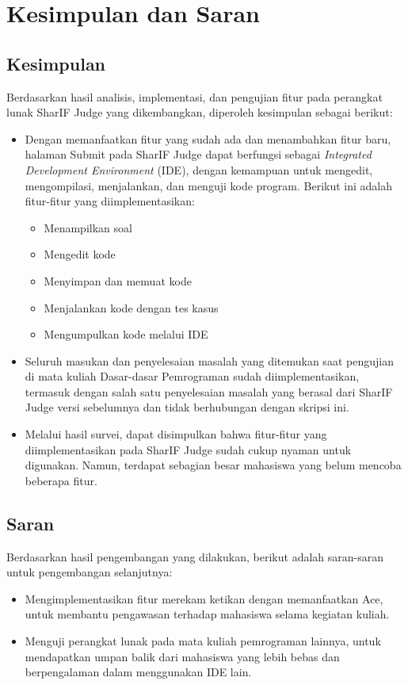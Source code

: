 \chapter{Kesimpulan dan Saran}
\label{chap:kesimpulandansaran}

\section{Kesimpulan}
\label{sec:6:kesimpulan}

Berdasarkan hasil analisis, implementasi, dan pengujian fitur pada perangkat lunak SharIF Judge yang dikembangkan, diperoleh kesimpulan sebagai berikut:

\begin{itemize}
    \item Dengan memanfaatkan fitur yang sudah ada dan menambahkan fitur baru, halaman Submit pada SharIF Judge dapat berfungsi sebagai {\it Integrated Development Environment} (IDE), dengan kemampuan untuk mengedit, mengompilasi, menjalankan, dan menguji kode program. Berikut ini adalah fitur-fitur yang diimplementasikan:
    \begin{itemize}
        \item Menampilkan soal
        \item Mengedit kode
        \item Menyimpan dan memuat kode
        \item Menjalankan kode dengan tes kasus
        \item Mengumpulkan kode melalui IDE
    \end{itemize}
    
    \item Seluruh masukan dan penyelesaian masalah yang ditemukan saat pengujian di mata kuliah Dasar-dasar Pemrograman sudah diimplementasikan, termasuk dengan salah satu penyelesaian masalah yang berasal dari SharIF Judge versi sebelumnya dan tidak berhubungan dengan skripsi ini.
    
    \item Melalui hasil survei, dapat disimpulkan bahwa fitur-fitur yang diimplementasikan pada SharIF Judge sudah cukup nyaman untuk digunakan. Namun, terdapat sebagian besar mahasiswa yang belum mencoba beberapa fitur.
\end{itemize}

\section{Saran}
\label{sec:6:saran}

Berdasarkan hasil pengembangan yang dilakukan, berikut adalah saran-saran untuk pengembangan selanjutnya:

\begin{itemize}
    \item Mengimplementasikan fitur merekam ketikan dengan memanfaatkan Ace, untuk membantu pengawasan terhadap mahasiswa selama kegiatan kuliah.
    \item Menguji perangkat lunak pada mata kuliah pemrograman lainnya, untuk mendapatkan umpan balik dari mahasiswa yang lebih bebas dan berpengalaman dalam menggunakan IDE lain.
\end{itemize}